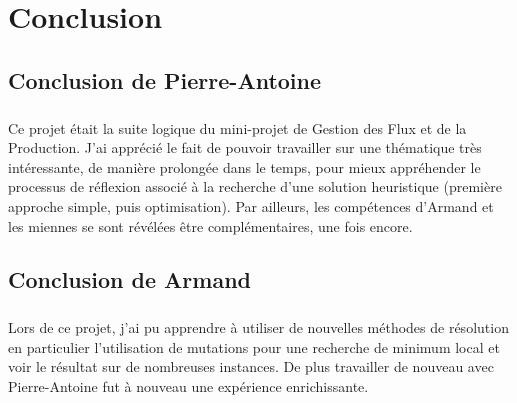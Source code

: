 \chapter{Conclusion}

\paragraph{}

\section{Conclusion de Pierre-Antoine}

\paragraph{}
Ce projet était la suite logique du mini-projet de Gestion des Flux et de la Production.
J'ai apprécié le fait de pouvoir travailler sur une thématique très intéressante, de manière prolongée dans le temps,
pour mieux appréhender le processus de réflexion associé à la recherche d'une solution heuristique (première approche simple, puis optimisation).
Par ailleurs, les compétences d'Armand et les miennes se sont révélées être complémentaires, une fois encore.

\section{Conclusion de Armand}

\paragraph{}
Lors de ce projet, j'ai pu apprendre à utiliser de nouvelles méthodes de résolution en particulier l'utilisation de mutations pour une recherche de minimum local et voir le résultat sur de nombreuses instances. De plus travailler de nouveau avec Pierre-Antoine fut à nouveau une expérience enrichissante. 
